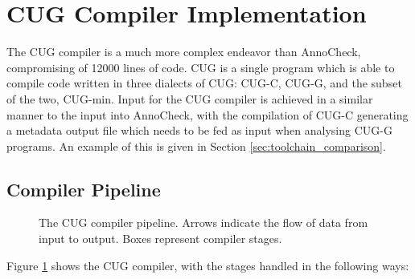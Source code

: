 \documentclass[a4paper,12pt,twoside,openright]{report}
\def\compilerloccount{12000 }
\begin{document}
\section{CUG Compiler Implementation}

The CUG compiler is a much more complex endeavor than AnnoCheck, compromising
of \compilerloccount lines of code. CUG is a single program which is able to
compile code written in three dialects of CUG: CUG-C, CUG-G, and the subset of
the two, CUG-min. Input for the CUG compiler is achieved in a similar manner to
the input into AnnoCheck, with the compilation of CUG-C generating a metadata
output file which needs to be fed as input when analysing CUG-G programs. An
example of this is given in Section \ref{sec:toolchain_comparison}.

\subsection{Compiler Pipeline}

\label{sec:compiler_pipeline}

\begin{figure}[h]
\centering
\def\svgwidth{\linewidth}
\scriptsize{}
\caption{The CUG compiler pipeline. Arrows indicate the flow of data from
input to output. Boxes represent compiler stages.}
\label{fig:cug_compiler_pipeline}
\end{figure}

Figure \ref{fig:cug_compiler_pipeline} shows the CUG compiler, with the
stages handled in the following ways:
\end{document}

